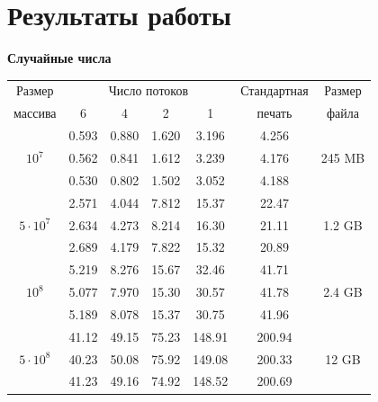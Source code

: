 \documentclass[12pt]{beamer}
\begin{document}
\section{Результаты работы}
\frame
{
\textbf{Случайные числа}
\begin{footnotesize}
\begin{center}
\begin{longtable}{||c|c|c|c|c|c|c||}
\hline
\hline
Размер & \multicolumn{4}{c|}{Число потоков} & Стандартная & Размер\\
\hhline{~|-|-|-|-|~|~|}
массива & 6 & 4 & 2 & 1 & печать &файла\\
\hline
\hline
 & 0.593 & 0.880 & 1.620 & 3.196 & 4.256 & \\
\hhline{~|-|-|-|-|-|~|}
$10^7$   & 0.562 & 0.841 & 1.612 & 3.239 & 4.176 & 245 MB \\
\hhline{~|-|-|-|-|-|~|}
 & 0.530 & 0.802 & 1.502 & 3.052 & 4.188 &\\
\hline
&2.571& 4.044 & 7.812 & 15.37 & 22.47 & \\
\hhline{~|-|-|-|-|-|~|}
$5 \cdot 10^7$  & 2.634 & 4.273 & 8.214 & 16.30 & 21.11 &  1.2 GB\\
\hhline{~|-|-|-|-|-|~|}
 & 2.689 & 4.179 & 7.822 & 15.32 & 20.89 & \\
\hline
 & 5.219 & 8.276 & 15.67 & 32.46 & 41.71 & \\
\hhline{~|-|-|-|-|-|~|}
$10^8$  & 5.077 & 7.970 & 15.30 & 30.57 & 41.78 & 2.4 GB\\
\hhline{~|-|-|-|-|-|~|}
& 5.189 & 8.078 & 15.37 & 30.75 & 41.96 & \\
\hline
 & 41.12 & 49.15 & 75.23 & 148.91 & 200.94 & \\
\hhline{~|-|-|-|-|-|~|}
$5 \cdot 10^8$ & 40.23 & 50.08 & 75.92 & 149.08 & 200.33 & 12 GB\\
\hhline{~|-|-|-|-|-|~|}
 & 41.23 & 49.16 & 74.92 & 148.52 & 200.69 & \\
\hline
\hline
\end{longtable}
\end{center}
\end{footnotesize}
}
\end{document}
